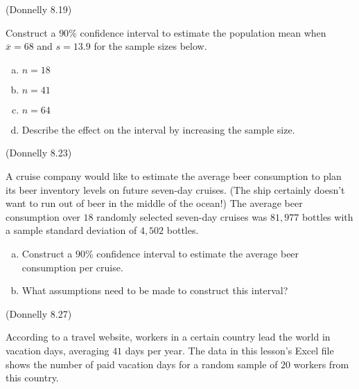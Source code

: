 \documentclass[12pt, letterpaper]{article}
\newcounter{exercise}
\theoremstyle{definition}
\begin{document}
\begin{exercise}  (Donnelly 8.19)

Construct a $90\%$ confidence interval to estimate the population mean when $\overline{x}=68$ and $s=13.9$ for the sample sizes below.

\end{exercise}

\begin{enumerate}[(a)]

\item $n=18$

\vfill

\item $n=41$

\vfill

\item $n=64$

\vfill

\item Describe the effect on the interval by increasing the sample size.

\vfill

\end{enumerate}

\newpage

\begin{exercise}  (Donnelly 8.23)

A cruise company would like to estimate the average beer consumption to plan its beer inventory levels on future seven-day cruises.  (The ship certainly doesn't want to run out of beer in the middle of the ocean!)  The average beer consumption over $18$ randomly selected seven-day cruises was $81,977$ bottles with a sample standard deviation of $4,502$ bottles.

\end{exercise}

\vfill

\begin{enumerate}[(a)]

\item Construct a $90\%$ confidence interval to estimate the average beer consumption per cruise.

\vfill

\item What assumptions need to be made to construct this interval?

\vfill

\end{enumerate}


\begin{exercise}  (Donnelly 8.27)

According to a travel website, workers in a certain country lead the world in vacation days, averaging $41$ days per year.  The data in this lesson's Excel file shows the number of paid vacation days for a random sample of $20$ workers from this country.

\end{exercise}
\end{document}
